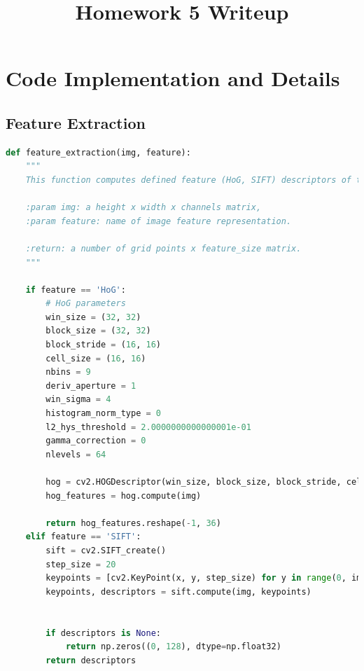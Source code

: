 \frenchspacing
\setlength{\parindent}{0cm} %
\setlength{\parskip}{0.3cm plus1mm minus1mm}

\pagestyle{fancy}
\fancyhf{}
\rfoot{\thepage}

\date{}

\title{\vspace{-1cm}Homework 5 Writeup}



\maketitle
\vspace{-3cm}
\thispagestyle{fancy}

\section*{Code Implementation and Details}
\subsection*{Feature Extraction}
\begin{lstlisting}[language=python]
def feature_extraction(img, feature):
    """
    This function computes defined feature (HoG, SIFT) descriptors of the target image.

    :param img: a height x width x channels matrix,
    :param feature: name of image feature representation.

    :return: a number of grid points x feature_size matrix.
    """

    if feature == 'HoG':
        # HoG parameters
        win_size = (32, 32)
        block_size = (32, 32)
        block_stride = (16, 16)
        cell_size = (16, 16)
        nbins = 9
        deriv_aperture = 1
        win_sigma = 4
        histogram_norm_type = 0
        l2_hys_threshold = 2.0000000000000001e-01
        gamma_correction = 0
        nlevels = 64
        
        hog = cv2.HOGDescriptor(win_size, block_size, block_stride, cell_size, nbins, deriv_aperture, win_sigma, histogram_norm_type, l2_hys_threshold, gamma_correction, nlevels)
        hog_features = hog.compute(img)
        
        return hog_features.reshape(-1, 36)
    elif feature == 'SIFT':
        sift = cv2.SIFT_create()
        step_size = 20
        keypoints = [cv2.KeyPoint(x, y, step_size) for y in range(0, img.shape[0], step_size) for x in range(0, img.shape[1], step_size)]
        keypoints, descriptors = sift.compute(img, keypoints)
        
        
        if descriptors is None:
            return np.zeros((0, 128), dtype=np.float32)
        return descriptors
\end{lstlisting}

